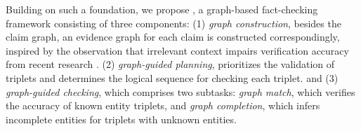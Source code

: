 Building on such a foundation, we propose {\MyFC}, a graph-based fact-checking framework consisting of three components: (1) \textit{graph construction}, besides the claim graph, an evidence graph for each claim is constructed correspondingly, inspired by the observation that irrelevant context impairs verification accuracy from recent research \cite{guan-etal-2024-language}. (2) \textit{graph-guided planning}, prioritizes the validation of triplets and determines the logical sequence for checking each triplet. and (3) \textit{graph-guided checking}, which comprises two subtasks: \textit{graph match}, which verifies the accuracy of known entity triplets, and \textit{graph completion}, which infers incomplete entities for triplets with unknown entities.









